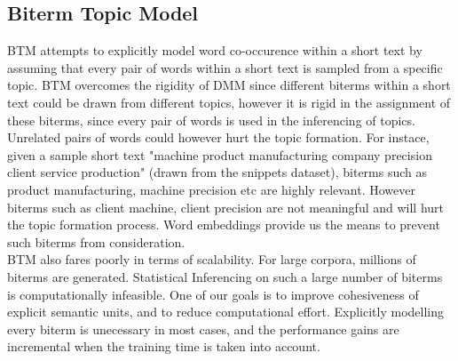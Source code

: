 \documentclass{sig-alternate-05-2015}
\begin{document}
\subsection{Biterm Topic Model}
BTM\cite{btm} attempts to explicitly model word co-occurence within a short text by assuming that every pair of words within a short text is sampled from a specific topic. BTM overcomes the rigidity of DMM since different biterms within a short text could be drawn from different topics, however it is rigid in the assignment of these biterms, since every pair of words is used in the inferencing of topics. Unrelated pairs of words could however hurt the topic formation. For instace, given a sample short text "machine product manufacturing company precision client service production" (drawn from the snippets dataset), biterms such as product manufacturing, machine precision etc are highly relevant. However biterms such as client machine, client precision are not meaningful and will hurt the topic formation process. Word embeddings provide us the means to prevent such biterms from consideration. 
\\
BTM also fares poorly in terms of scalability. For large corpora, millions of biterms are generated. Statistical Inferencing on such a large number of biterms is computationally infeasible. One of our goals is to improve cohesiveness of explicit semantic units, and to reduce computational effort. Explicitly modelling every biterm is unecessary in most cases, and the performance gains are incremental when the training time is taken into account.
\end{document}
